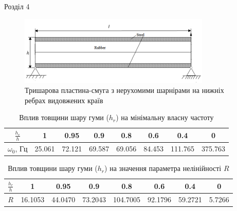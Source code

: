 \documentclass[8pt]{beamer}
\numberwithin{figure}{section}
\numberwithin{equation}{section}
\numberwithin{table}{section}
\begin{document}
\begin{frame}{Розділ 4}

\begin{figure}
	\includegraphics[scale=0.5]{pic/plate3layers.png}
		\caption{Тришарова пластина-смуга з нерухомими шарнірами на нижніх ребрах видовжених країв}
\end{figure}
\begin{table}[h!]
\centering
 \begin{tabular}{| c | c | c | c | c | c | c | c |} 
 \hline
 $\displaystyle \frac{h_{r}}{h}$ & 1 & 0.95 & 0.9 & 0.8 & 0.6 & 0.4 & 0 \\ 
  \hline
 $\omega_0$, Гц & 25.061 & 72.121 & 69.587 & 69.056 & 84.453 & 111.765 & 375.763 \\
   \hline
\end{tabular}
\caption{Вплив товщини шару гуми ($h_{r}$) на мінімальну власну частоту}
\label{table:2}
\end{table}

\begin{table}[h!]
\centering
 \begin{tabular}{| c | c | c | c | c | c | c | c |} 
 \hline
 $\displaystyle \frac{h_{r}}{h}$ & 1 & 0.95 & 0.9 & 0.8 & 0.6 & 0.4 & 0 \\ 
  \hline
 $R$ & 16.1053 & 44.0470 & 73.2043 & 104.7005 & 92.1796 & 59.2721 & 5.7266 \\
   \hline
\end{tabular}
\caption{Вплив товщини шару гуми ($h_{r}$) на значення параметра нелінійності $R$}
\label{table:3}
\end{table}

\end{frame}
\end{document}
